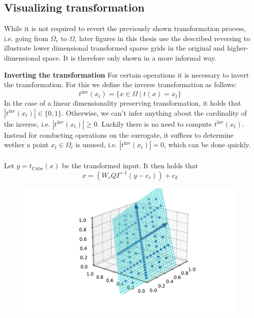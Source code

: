 \documentclass[
  a4paper,  %
  twoside,  %
  bibliography=totoc,
  headsepline,
  cleardoublepage=empty,
  parskip=half,
  draft=false
]{scrbook}
\begin{document}
\subsection{Visualizing transformation}

While it is not required to revert the previously shown transformation process, i.e. going from $\Omega_r$ to $\Omega$, later figures in this thesis use the described reversing to illustrate lower dimensional transformed sparse grids in the original and higher-dimensional space.
It is therefore only shown in a more informal way.

\textbf{Inverting the transformation  }
For certain operations it is necessary to invert the transformation.
For this we define the inverse transformation as follows:
\begin{equation}
t^{\text{inv}}(x_{t})=\{x \in \Omega \mid t(x)=x_{t}\}
\end{equation}
In the case of a linear dimensionality preserving transformation, it holds that $|t^{\text{inv}}(x_{t})| \in \{0,1\}$.
Otherwise, we can't infer anything about the cardinality of the inverse, i.e. $|t^{\text{inv}}(x_{t})| \geq 0$.
Luckily there is no need to compute $t^{\text{inv}}(x_{t})$. Instead for conducting operations on the surrogate, it suffices to determine wether a point $x_t \in \Omega_t$ is unused, i.e. $|t^{\text{inv}}(x_{t})| = 0$, which can be done quickly.
\\
\\

Let $y=t_{\text{Cube}}(x)$ be the transformed input. It then holds that
\begin{equation}
x=(W_r Q \Gamma^{-1} (y - c_r)) + c_d
\end{equation}

\begin{figure}[H]
\centering
  \includegraphics{graphics/surrogate_vis}
  \label{fig:f2_combined_rel_errors_inter}
\end{figure}
\end{document}
